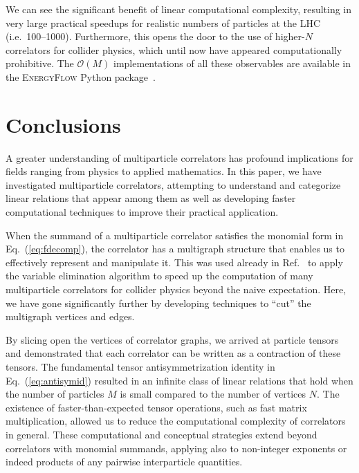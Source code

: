 \documentclass[aps,prd,floatfix,preprintnumbers,twocolumn,groupedaddress,nofootinbib,longbibliography,10pt]{revtex4-1}
\providecommand{\href}[2]{#2}
\DeclareRobustCommand{\Eq}[1]{Eq.~(\ref{#1})}
\DeclareRobustCommand{\Ref}[1]{Ref.~\cite{#1}}
\begin{document}
We can see the significant benefit of linear computational complexity, resulting in very large practical speedups for realistic numbers of particles at the LHC (i.e.~100--1000).
%
Furthermore, this opens the door to the use of higher-$N$ correlators for collider physics, which until now have appeared computationally prohibitive.
%
The $\mathcal O(M)$ implementations of all these observables are available in the \href{https://energyflow.network}{\textsc{EnergyFlow}} Python package~\cite{EnergyFlow}.



\section{Conclusions}
\label{sec:conc}


A greater understanding of multiparticle correlators has profound implications for fields ranging from physics to applied mathematics.
%
In this paper, we have investigated multiparticle correlators, attempting to understand and categorize linear relations that appear among them as well as developing faster computational techniques to improve their practical application.


When the summand of a multiparticle correlator satisfies the monomial form in \Eq{eq:fdecomp}, the correlator has a multigraph structure that enables us to effectively represent and manipulate it.
%
This was used already in \Ref{Komiske:2017aww} to apply the variable elimination algorithm to speed up the computation of many multiparticle correlators for collider physics beyond the naive expectation.
%
Here, we have gone significantly further by developing techniques to ``cut'' the multigraph vertices and edges.


By slicing open the vertices of correlator graphs, we arrived at particle tensors and demonstrated that each correlator can be written as a contraction of these tensors.
%
The fundamental tensor antisymmetrization identity in \Eq{eq:antisymid} resulted in an infinite class of linear relations that hold when the number of particles $M$ is small compared to the number of vertices $N$.
%
The existence of faster-than-expected tensor operations, such as fast matrix multiplication, allowed us to reduce the computational complexity of correlators in general.
%
These computational and conceptual strategies extend beyond correlators with monomial summands, applying also to non-integer exponents or indeed products of any pairwise interparticle quantities.
\end{document}
